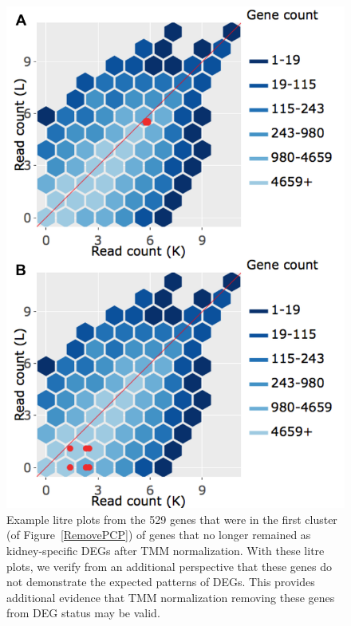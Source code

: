 \documentclass{article}
\begin{document}
\null
\begin{figure}[t!]
\centerline{\includegraphics[width=0.7\columnwidth]{../MakeFigures/Dashboards/litreClusterRemove/litreClusterRemove.jpg}}
\caption{Example litre plots from the 529 genes that were in the first cluster (of Figure~\ref{RemovePCP}) of genes that no longer remained as kidney-specific DEGs after TMM normalization. With these litre plots, we verify from an additional perspective that these genes do not demonstrate the expected patterns of DEGs. This provides additional evidence that TMM normalization removing these genes from DEG status may be valid.
\label{litreClusterRemove}}
\end{figure}
\end{document}
